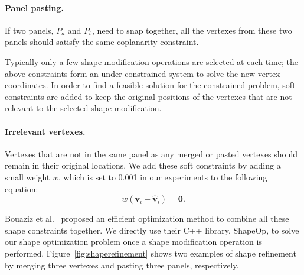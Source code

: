 \paragraph{Panel pasting.} 
If two panels, $P_a$ and $P_b$, need to snap together, all the vertexes from these two panels should satisfy the same coplanarity constraint. 
 
Typically only a few shape modification operations are selected at each time; the above constraints form an under-constrained system to solve the new vertex coordinates. In order to find a feasible solution for the constrained problem, soft constraints are added to keep the original positions of the vertexes that are not relevant to the selected shape modification.

\paragraph{Irrelevant vertexes.} 
Vertexes that are not in the same panel as any merged or pasted vertexes should remain in their original locations.
We add these soft constraints by adding a small weight $w$, which is set to 0.001 in our experiments to the following equation:
\begin{equation}
w(\mathbf{v}_i - \mathbf{\hat{v}}_i) = \mathbf{0}.
\label{equ:irrelevant}
\end{equation}

Bouaziz et al.~\cite{Bouaziz:2012:SSD:2346796.2346802} proposed an efficient optimization method to combine all these shape constraints together. We directly use their C++ library, ShapeOp, to solve our shape optimization problem once a shape modification operation is performed.
Figure~\ref{fig:shaperefinement} shows two examples of shape refinement by merging three vertexes and pasting three panels, respectively. 
 
% 


%

